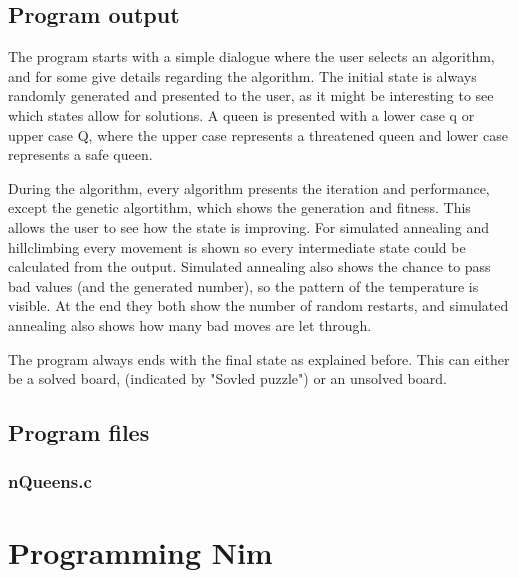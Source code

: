 \documentclass{article}
\begin{document}
\subsection*{Program output}
The program starts with a simple dialogue where the user selects an algorithm, and for some give details regarding the algorithm. The initial state is always randomly generated and presented to the user, as it might be interesting to see which states allow for solutions. A queen is presented with a lower case q or upper case Q, where the upper case represents a threatened queen and lower case represents a safe queen. 

During the algorithm, every algorithm presents the iteration and performance, except the genetic algortithm, which shows the generation and fitness. This allows the user to see how the state is improving. 
For simulated annealing and hillclimbing every movement is shown so every intermediate state could be calculated from the output. Simulated annealing also shows the chance to pass bad values (and the generated number), so the pattern of the temperature is visible. At the end they both show the number of random restarts, and simulated annealing also shows how many bad moves are let through. 

The program always ends with the final state as explained before. This can either be a solved board, (indicated by "Sovled puzzle") or an unsolved board.

\subsection*{Program files}
\subsubsection*{nQueens.c}


\section*{Programming Nim} 
\end{document}
